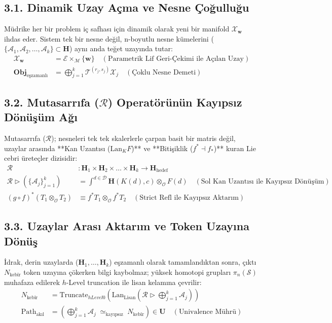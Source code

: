 \documentclass[11pt, a4paper]{article}
\begin{document}
\subsection{3.1. Dinamik Uzay Açma ve Nesne Çoğulluğu}
Müdrike her bir problem iç safhası için dinamik olarak yeni bir manifold $\mathcal{X}_{\mathbf{w}}$ ihdas eder. Sistem tek bir nesne değil, n-boyutlu nesne kümelerini ($\{\mathcal{A}_1, \mathcal{A}_2, \dots, \mathcal{A}_k\} \subset \mathbf{H}$) aynı anda teğet uzayında tutar:
\begin{align}
\mathcal{X}_{\mathbf{w}} &= \mathcal{E} \times_{\mathcal{M}} \{\mathbf{w}\} \quad (\text{Parametrik Lif Geri-Çekimi ile Açılan Uzay}) \\
\mathbf{Obj}_{\text{eşzamanlı}} &= \bigoplus_{j=1}^k \mathcal{T}^{(r_j, s_j)} \mathcal{X}_j \quad (\text{Çoklu Nesne Demeti})
\end{align}

\subsection{3.2. Mutasarrıfa ($\mathcal{R}$) Operatörünün Kayıpsız Dönüşüm Ağı}
Mutasarrıfa ($\mathcal{R}$); nesneleri tek tek skalerlerle çarpan basit bir matris değil, uzaylar arasında **Kan Uzantısı ($\text{Lan}_K F$)** ve **Bitişiklik ($f^* \dashv f_*$)** kuran Lie cebri üreteçler dizisidir:
\begin{align}
\mathcal{R} &: \mathbf{H}_1 \times \mathbf{H}_2 \times \dots \times \mathbf{H}_k \longrightarrow \mathbf{H}_{\text{hedef}} \\
\mathcal{R} \triangleright \left( \{\mathcal{A}_j\}_{j=1}^k \right) &= \int^{d \in \mathcal{D}} \mathbf{H}(K(d), c) \otimes_{\mathcal{O}} F(d) \quad (\text{Sol Kan Uzantısı ile Kayıpsız Dönüşüm}) \\
(g \circ f)^*(T_1 \otimes_{\mathcal{O}} T_2) &\equiv f^* T_1 \otimes_{\mathcal{O}} f^* T_2 \quad (\text{Strict Refl ile Kayıpsız Aktarım})
\end{align}

\subsection{3.3. Uzaylar Arası Aktarım ve Token Uzayına Dönüş}
İdrak, derin uzaylarda ($\mathbf{H}_1, \dots, \mathbf{H}_k$) eşzamanlı olarak tamamlandıktan sonra, çıktı $N_{\text{kebîr}}$ token uzayına çökerken bilgi kaybolmaz; yüksek homotopi grupları $\pi_n(\mathcal{S})$ muhafaza edilerek $h$-Level truncation ile lisan kelamına çevrilir:
\begin{align}
N_{\text{kebîr}} &= \text{Truncate}_{hLevel 0}\left( \text{Lan}_{\text{Lisan}} \left( \mathcal{R} \triangleright \bigoplus_{j=1}^k \mathcal{A}_j \right) \right) \\
\text{Path}_{\text{akıl}} &= \left( \bigoplus_{j=1}^k \mathcal{A}_j \; \simeq_{\text{kayıpsız}} \; N_{\text{kebîr}} \right) \in \mathbf{U} \quad (\text{Univalence Mührü})
\end{align}
\end{document}
